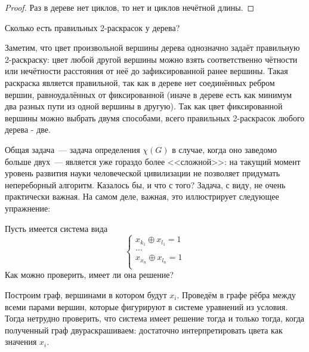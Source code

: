 \begin{proof}
    Раз в дереве нет циклов, то нет и циклов нечётной длины.
\end{proof}

\begin{Exercise}[counter=SecExercise, label={exercise:graphs:tree_2_coloring}]
    \noindent
    Сколько есть правильных 2-раскрасок у дерева?
\end{Exercise}

\begin{Answer}
    \noindent
    Заметим, что цвет произвольной вершины дерева однозначно задаёт правильную 2-рас\-крас\-ку:
    цвет любой другой вершины можно взять соответственно чётности или нечётности расстояния от неё до зафиксированной ранее вершины.
    Такая раскраска является правильной, так как в дереве нет соединённых ребром вершин, равноудалённых от фиксированной
    (иначе в дереве есть как минимум два разных пути из одной вершины в другую).
    Так как цвет фиксированной вершины можно выбрать двумя способами,
    всего правильных 2-раскрасок любого дерева - две.
\end{Answer}

Общая задача~--- задача определения $ \chi(G) $ в случае, когда оно заведомо больше двух~--- является уже гораздо более <<сложной>>:
на такущий момент уровень развития науки человеческой цивилизации не позволяет придумать непереборный алгоритм.
Казалось бы, и что с того?
Задача, с виду, не очень практически важная.
На самом деле, важная, это иллюстрирует следующее упражнение:

\begin{Exercise}[counter=SecExercise]
    \noindent
    Пусть имеется система вида
    \[
        \begin{cases}
            x_{k_1} \oplus x_{l_1} = 1 \\
            \ldots \\
            x_{x_n} \oplus x_{l_n} = 1 \\
        \end{cases}
    \]
    Как можно проверить, имеет ли она решение?
\end{Exercise}

\begin{Answer}
    \noindent
    Построим граф, вершинами в котором будут $ x_i $.
    Проведём в графе рёбра между всеми парами вершин, которые фигурируют в системе уравнений из условия.
    Тогда нетрудно проверить, что система имеет решение тогда и только тогда, когда полученный граф двураскрашиваем:
    достаточно интерпретировать цвета как значения $ x_i $.
\end{Answer}


